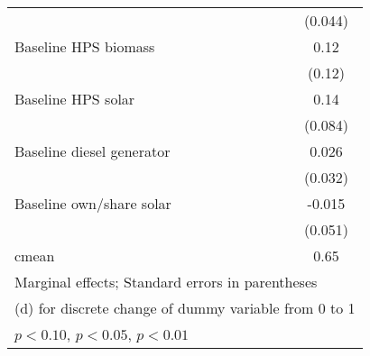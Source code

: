 \begin{table}[htbp]
\begin{tabular*}{1\hsize}{@{\hskip\tabcolsep\extracolsep\fill}l*{5}{c}}
                &                  &                  &                  &                  &  (0.044)         \\
Baseline HPS biomass&                  &                  &                  &                  &     0.12         \\
                &                  &                  &                  &                  &   (0.12)         \\
Baseline HPS solar&                  &                  &                  &                  &     0.14\sym{*}  \\
                &                  &                  &                  &                  &  (0.084)         \\
Baseline diesel generator&                  &                  &                  &                  &    0.026         \\
                &                  &                  &                  &                  &  (0.032)         \\
Baseline own/share solar&                  &                  &                  &                  &   -0.015         \\
                &                  &                  &                  &                  &  (0.051)         \\
\midrule
cmean           &                  &                  &                  &                  &     0.65         \\
\bottomrule
\multicolumn{6}{l}{\footnotesize Marginal effects; Standard errors in parentheses}\\
\multicolumn{6}{l}{\footnotesize  (d) for discrete change of dummy variable from 0 to 1}\\
\multicolumn{6}{l}{\footnotesize \sym{*} \(p<0.10\), \sym{**} \(p<0.05\), \sym{***} \(p<0.01\)}\\
\end{tabular*}
\end{table}
